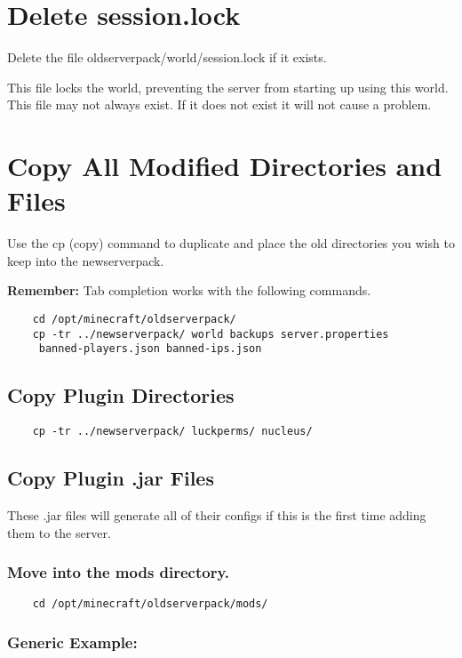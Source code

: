 \documentclass{report}
\begin{document}
\section{Delete session.lock}
Delete the file oldserverpack/world/session.lock if it exists.

This file locks the world, preventing the server from starting up using this world. This file may not always exist. If it does not exist it will not cause a problem.

\section{Copy All Modified Directories and Files}
Use the cp (copy) command to duplicate and place the old directories you wish to keep into the newserverpack.

\textbf{Remember:} Tab completion works with the following commands.

\begin{verbatim}
	cd /opt/minecraft/oldserverpack/
	cp -tr ../newserverpack/ world backups server.properties
	 banned-players.json banned-ips.json 
\end{verbatim}

\subsection{Copy Plugin Directories}
\begin{verbatim}
	cp -tr ../newserverpack/ luckperms/ nucleus/
\end{verbatim}

\subsection{Copy Plugin .jar Files}
These .jar files will generate all of their configs if this is the first time adding them to the server.

\subsubsection*{Move into the mods directory.}

\begin{verbatim}
	cd /opt/minecraft/oldserverpack/mods/
\end{verbatim}

\subsubsection*{Generic Example:}
\end{document}
